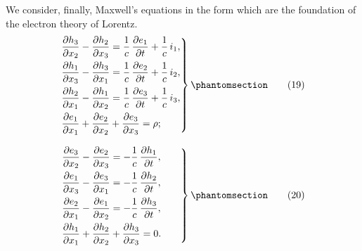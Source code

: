 \documentclass[12pt]{book}[2005/09/16]
\newcommand{\Change}[2]{#2}
\newcommand{\Add}[1]{\Change{}{#1}}
\newcommand{\PageSep}[1]{\ignorespaces}
\newcommand{\Tag}[1]{%
  \phantomsection
  \label{eqn:#1}
  \tag*{#1}
}
\newcommand{\dd}{\partial}
\begin{document}
We consider, finally, Maxwell's equations in the form
%
which are the foundation of the electron theory of Lorentz.
\begin{align*}
\left.
  \begin{aligned}
    &\begin{alignedat}{3}
      \frac{\dd h_{3}}{\dd x_{2}} &- \frac{\dd h_{2}}{\dd x_{3}}
      &&= \frac{1}{c}\, \frac{\dd e_{1}}{\dd t}
      &&+ \frac{1}{c}\, i_{1}\Add{,} \\
%
      \frac{\dd h_{1}}{\dd x_{3}} &- \frac{\dd h_{3}}{\dd x_{1}}
      &&= \frac{1}{c}\, \frac{\dd e_{2}}{\dd t}
      &&+ \frac{1}{c}\, i_{2}\Add{,} \\
%
      \frac{\dd h_{2}}{\dd x_{1}} &- \frac{\dd h_{1}}{\dd x_{2}}
      &&= \frac{1}{c}\, \frac{\dd e_{3}}{\dd t}
      &&+ \frac{1}{c}\, i_{3}\Add{,}
    \end{alignedat} \\
    & \frac{\dd e_{1}}{\dd x_{1}}
    + \frac{\dd e_{2}}{\dd x_{2}}
    + \frac{\dd e_{3}}{\dd x_{3}} = \rho\Add{;}
  \end{aligned}
\right\}
\Tag{(19)} \\[8pt]
\left.
  \begin{aligned}
    &\begin{alignedat}{2}
      \frac{\dd e_{3}}{\dd x_{2}} &- \frac{\dd e_{2}}{\dd x_{3}}
      &&= -\frac{1}{c}\, \frac{\dd h_{1}}{\dd t}\Add{,}\qquad \\
%
      \frac{\dd e_{1}}{\dd x_{3}} &- \frac{\dd e_{3}}{\dd x_{1}}
      &&= -\frac{1}{c}\, \frac{\dd h_{2}}{\dd t}\Add{,} \\
%
      \frac{\dd e_{2}}{\dd x_{1}} &- \frac{\dd e_{1}}{\dd x_{2}}
      &&= -\frac{1}{c}\, \frac{\dd h_{3}}{\dd t}\Add{,}
    \end{alignedat} \\
    & \frac{\dd h_{1}}{\dd x_{1}}
    + \frac{\dd h_{2}}{\dd x_{2}}
    + \frac{\dd h_{3}}{\dd x_{3}} = 0\Add{.}
  \end{aligned}
\right\}
\Tag{(20)}
\end{align*}
\PageSep{24}
\end{document}
